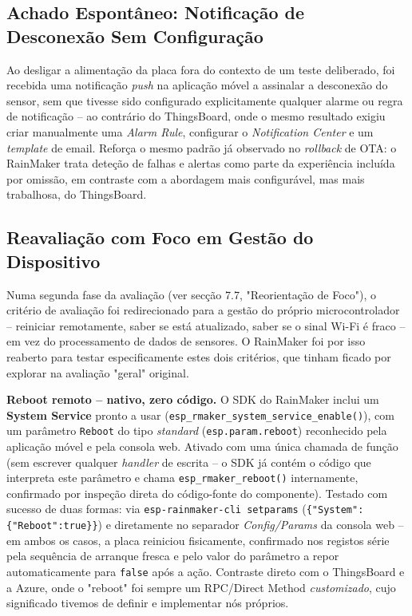 \documentclass[a4paper,12pt]{article}
\begin{document}
\subsection{Achado Espontâneo: Notificação de Desconexão Sem Configuração}
Ao desligar a alimentação da placa fora do contexto de um teste deliberado, foi recebida uma notificação \textit{push} na aplicação móvel a assinalar a desconexão do sensor, sem que tivesse sido configurado explicitamente qualquer alarme ou regra de notificação -- ao contrário do ThingsBoard, onde o mesmo resultado exigiu criar manualmente uma \textit{Alarm Rule}, configurar o \textit{Notification Center} e um \textit{template} de email. Reforça o mesmo padrão já observado no \textit{rollback} de OTA: o RainMaker trata deteção de falhas e alertas como parte da experiência incluída por omissão, em contraste com a abordagem mais configurável, mas mais trabalhosa, do ThingsBoard.

\subsection{Reavaliação com Foco em Gestão do Dispositivo}
Numa segunda fase da avaliação (ver secção 7.7, "Reorientação de Foco"), o critério de avaliação foi redirecionado para a gestão do próprio microcontrolador -- reiniciar remotamente, saber se está atualizado, saber se o sinal Wi-Fi é fraco -- em vez do processamento de dados de sensores. O RainMaker foi por isso reaberto para testar especificamente estes dois critérios, que tinham ficado por explorar na avaliação "geral" original.

\textbf{Reboot remoto -- nativo, zero código.} O SDK do RainMaker inclui um \textbf{System Service} pronto a usar (\texttt{esp\_rmaker\_system\_service\_enable()}), com um parâmetro \texttt{Reboot} do tipo \textit{standard} (\texttt{esp.param.reboot}) reconhecido pela aplicação móvel e pela consola web. Ativado com uma única chamada de função (sem escrever qualquer \textit{handler} de escrita -- o SDK já contém o código que interpreta este parâmetro e chama \texttt{esp\_rmaker\_reboot()} internamente, confirmado por inspeção direta do código-fonte do componente). Testado com sucesso de duas formas: via \texttt{esp-rainmaker-cli setparams} (\texttt{\{"System":\{"Reboot":true\}\}}) e diretamente no separador \textit{Config/Params} da consola web -- em ambos os casos, a placa reiniciou fisicamente, confirmado nos registos série pela sequência de arranque fresca e pelo valor do parâmetro a repor automaticamente para \texttt{false} após a ação. Contraste direto com o ThingsBoard e a Azure, onde o "reboot" foi sempre um RPC/Direct Method \textit{customizado}, cujo significado tivemos de definir e implementar nós próprios.
\end{document}
